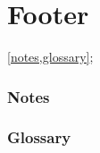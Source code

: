 \newpage
\part{Footer}
\cref{notes,glossary};

\newpage
\section{Notes}
\label{notes}


\newpage
\section{Glossary}
\label{glossary}
\printglossaries